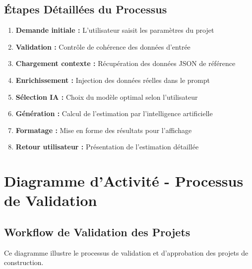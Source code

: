 \subsection{Étapes Détaillées du Processus}

\begin{enumerate}
    \item \textbf{Demande initiale :} L'utilisateur saisit les paramètres du projet
    \item \textbf{Validation :} Contrôle de cohérence des données d'entrée
    \item \textbf{Chargement contexte :} Récupération des données JSON de référence
    \item \textbf{Enrichissement :} Injection des données réelles dans le prompt
    \item \textbf{Sélection IA :} Choix du modèle optimal selon l'utilisateur
    \item \textbf{Génération :} Calcul de l'estimation par l'intelligence artificielle
    \item \textbf{Formatage :} Mise en forme des résultats pour l'affichage
    \item \textbf{Retour utilisateur :} Présentation de l'estimation détaillée
\end{enumerate}


\section{Diagramme d'Activité - Processus de Validation}

\subsection{Workflow de Validation des Projets}

Ce diagramme illustre le processus de validation et d'approbation des projets de construction.

